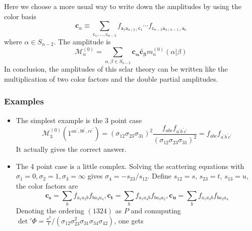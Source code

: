 \documentclass{beamer}
\begin{document}
\begin{frame}
    Here we choose a more usual way to write down the amplitudes by using the color basis
    \begin{equation*}
        \boxed{\mathbf{c}_\alpha\equiv\sum_{\mathsf{c}_1,...,\mathsf{c}_{n-3}}f_{\mathsf{a}_1\mathsf{a}_{\alpha(2)}\mathsf{c}_1}\cdots f_{\mathsf{c}_{n-3}\mathsf{a}_{\alpha(n-1)}\mathsf{a}_n}}
    \end{equation*}
    where $\alpha \in S_{n-2}$. The amplitude is 
    \begin{equation*}
        \mathcal{M}_n^{(0)}=\sum_{\alpha,\beta\in S_{n-2}}\mathbf{c_\alpha}\tilde{\mathbf{c_\beta}}m_{n}^{(0)}(\alpha|\beta)
    \end{equation*}
    In conclusion, the amplitudes of this sclar theory can be written like the multiplication of two color factors and the double partial amplitudes.
\end{frame}
\begin{frame}
    \frametitle{Examples}
    \begin{itemize}
        \item The simplest example is the 3 point case
        \begin{equation*}
            \mathcal{M}_3^{(0)}(1^{aa^\prime,bb^\prime,cc^\prime})=(\sigma_{12}\sigma_{23}\sigma_{31})^2\frac{f_{abc}f_{a^\prime b^\prime c^\prime}}{(\sigma_{12}\sigma_{23}\sigma_{31})^2}=f_{abc}f_{a^\prime b^\prime c^\prime}
        \end{equation*}
        It actually gives the correct answer.
        \pause
        \item The 4 point case is a little complex. Solving the scattering equations with $\sigma_1=0,\sigma_2=1,\sigma_3=\infty$ gives $\sigma_4=-s_{23}/s_{12}$. Define
        $s_{12}=s$, $s_{23}=t$, $s_{13}=u$, the color factors are 
        \begin{equation*}
            \mathbf{c_s}=\sum_bf_{a_1a_2b}f_{ba_3a_4},\mathbf{c_t}=\sum_bf_{a_1a_4b}f_{ba_3a_2},\mathbf{c_u}=\sum_bf_{a_1a_3b}f_{ba_2a_4}
        \end{equation*}
        Denoting the ordering $(1324)$ as $P$ and comuputing $\det{'}\Phi=\frac{s^2}{t}/(\sigma_{12}\sigma_{23}^2\sigma_{31}\sigma_{34}\sigma_{42})$, one gets
    \end{itemize}
\end{frame}
\end{document}

